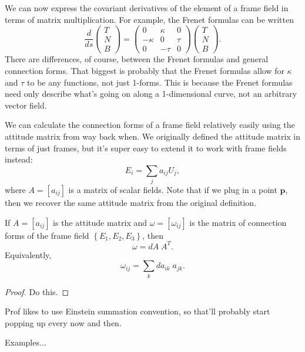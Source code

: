 \documentclass[10pt]{report}
\begin{document}
We can now express the covariant derivatives of the element of a frame field in terms of matrix multiplication. For example, the Frenet formulas can be written
\[
\frac{d }{d s} 
\begin{pmatrix}
	T \\ N \\ B
\end{pmatrix} = 
\begin{pmatrix}
	0 & \kappa & 0 \\
	-\kappa &0&\tau \\
	0&-\tau&0
\end{pmatrix}
\begin{pmatrix}
	T \\ N \\ B
\end{pmatrix}.
\] 
There are differences, of course, between the Frenet formulas and general connection forms. That biggest is probably that the Frenet formulas allow for $\kappa$ and $\tau$ to be any functions, not just 1-forms. This is because the Frenet formulas need only describe what's going on along a 1-dimensional curve, not an arbitrary vector field.

We can calculate the connection forms of a frame field relatively easily using the attitude matrix from way back when. We originally defined the attitude matrix in terms of just frames, but it's super easy to extend it to work with frame fields instead:
\[
E_i = \sum_j a_{ij}U_j,
\] where $A = [a_{ij}]$ is a matrix of scalar fields. Note that if we plug in a point $\mathbf{p}$, then we recover the same attitude matrix from the original definition.

\begin{thrm}[]
	If $A=[a_{ij}]$ is the attitude matrix and $\omega=[\omega_{ij}]$ is the matrix of connection forms of the frame field $\left\{ E_1,E_2,E_3 \right\}$, then
	\[
	\omega = dA \; A^T.
	\] 
	Equivalently,
	\[
	\omega_{ij} = \sum_k da_{ik}\;a_{jk}.
	\] 
\end{thrm}
\begin{proof}
	{\color{red}Do this.}
\end{proof}

\begin{note}[]
Prof likes to use Einstein summation convention, so that'll probably start popping up every now and then.
\end{note}

{\color{red}Examples...}

\end{document}
